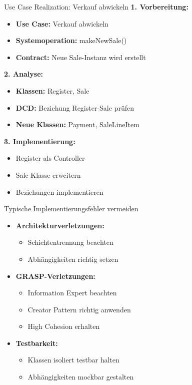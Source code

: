\begin{example}{Use Case Realization: Verkauf abwickeln}
\textbf{1. Vorbereitung:}
\begin{itemize}
    \item \textbf{Use Case:} Verkauf abwickeln
    \item \textbf{Systemoperation:} makeNewSale()
    \item \textbf{Contract:} Neue Sale-Instanz wird erstellt
\end{itemize}

\textbf{2. Analyse:}
\begin{itemize}
    \item \textbf{Klassen:} Register, Sale
    \item \textbf{DCD:} Beziehung Register-Sale prüfen
    \item \textbf{Neue Klassen:} Payment, SaleLineItem
\end{itemize}

\textbf{3. Implementierung:}
\begin{itemize}
    \item Register als Controller
    \item Sale-Klasse erweitern
    \item Beziehungen implementieren
\end{itemize}
\end{example}

\begin{KR}{Typische Implementierungsfehler vermeiden}\\
\begin{itemize}
    \item \textbf{Architekturverletzungen:}
    \begin{itemize}
        \item Schichtentrennung beachten
        \item Abhängigkeiten richtig setzen
    \end{itemize}
    
    \item \textbf{GRASP-Verletzungen:}
    \begin{itemize}
        \item Information Expert beachten
        \item Creator Pattern richtig anwenden
        \item High Cohesion erhalten
    \end{itemize}
    
    \item \textbf{Testbarkeit:}
    \begin{itemize}
        \item Klassen isoliert testbar halten
        \item Abhängigkeiten mockbar gestalten
    \end{itemize}
\end{itemize}
\end{KR}
